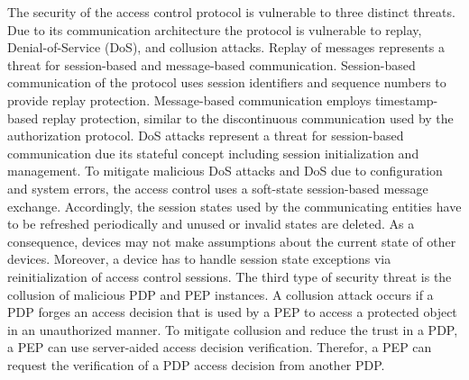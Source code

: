 The security of the access control protocol is vulnerable to three distinct threats.
Due to its communication architecture the protocol is vulnerable to replay, Denial-of-Service (DoS), and collusion attacks.
Replay of messages represents a threat for session-based and message-based communication.
Session-based communication of the protocol uses session identifiers and sequence numbers to provide replay protection.
Message-based communication employs timestamp-based replay protection, similar to the discontinuous communication used by the authorization protocol.
DoS attacks represent a threat for session-based communication due its stateful concept including session initialization and management.
To mitigate malicious DoS attacks and DoS due to configuration and system errors, the access control uses a soft-state session-based message exchange.
Accordingly, the session states used by the communicating entities have to be refreshed periodically and unused or invalid states are deleted.
As a consequence, devices may not make assumptions about the current state of other devices.
Moreover, a device has to handle session state exceptions via reinitialization of access control sessions.
The third type of security threat is the collusion of malicious PDP and PEP instances.
A collusion attack occurs if a PDP forges an access decision that is used by a PEP to access a protected object in an unauthorized manner.
To mitigate collusion and reduce the trust in a PDP, a PEP can use server-aided access decision verification.
Therefor, a PEP can request the verification of a PDP access decision from another PDP.

